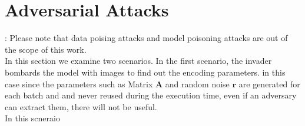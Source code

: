 \section{Adversarial Attacks}:
Please note that data poising attacks and model poisoning attacks are out of the scope of this work. \\
In this section we examine two scenarios. In the first scenario, the invader bombards the model with images to find out the encoding parameters. in this case since the parameters such as Matrix $\mathbf A$ and random noise $\mathbf r$ are generated for each batch and and never reused during the execution time, even if an adversary can extract them, there will not be useful. \\

In this scneraio 
